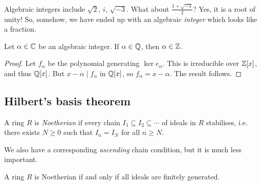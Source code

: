 \documentclass{../template/note}
\begin{document}
    \begin{example*}
        Algebraic integers include $\sqrt 2$, $i$, $\sqrt{-3}$. What about $\frac{1+\sqrt{-3}}{2}$? Yes, it is a root of unity! So, somehow, we have ended up with an algebraic \emph{integer} which looks like a fraction.
    \end{example*}
    
    \begin{proposition}
        Let $\alpha \in \mathbb C$ be an algebraic integer. If $\alpha \in \mathbb Q$, then $\alpha \in \mathbb Z$.
    \end{proposition}
    
    \begin{proof}
        Let $f_\alpha$ be the polynomial generating $\ker e_\alpha$. This is irreducible over $\mathbb Z[x]$, and thus $\mathbb Q[x]$. But $x-\alpha \mid f_\alpha$ in $\mathbb Q[x]$, so $f_\alpha = x-\alpha$. The result follows.
    \end{proof}
    
    
    
    
    
    
    
    
    
    
    
    
    
    
    
    \subsection{Hilbert's basis theorem}

    \begin{definition}
        A ring $R$ is \emph{Noetherian} if every chain $I_1 \subseteq I_2 \subseteq \cdots$ of ideals in $R$ stabilises, i.e. there exists $N \geq 0$ such that $I_n = I_N$ for all $n \geq N$.
    \end{definition}
    
    \begin{remark*}
        We also have a corresponding \emph{ascending} chain condition, but it is much less important.
    \end{remark*}
    
    \begin{proposition}
        A ring $R$ is Noetherian if and only if all ideals are finitely generated.
    \end{proposition}
    
\end{document}
